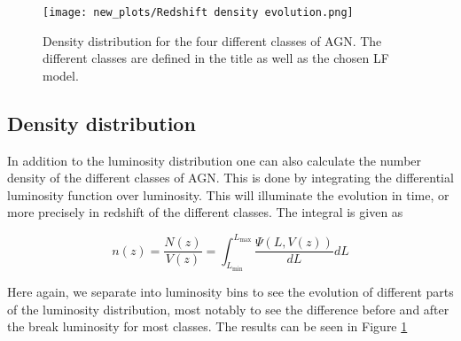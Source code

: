 \begin{figure}[H]
    \centering
    \texttt{[image: new\_plots/Redshift density evolution.png]}
    \caption{Density distribution for the four different classes of AGN. The different classes are defined in the title as well as the chosen LF model.}
    \label{fig:DD}
\end{figure}



\subsection{Density distribution}

In addition to the luminosity distribution one can also calculate the number density of the different classes of AGN. This is done by integrating the
differential luminosity function over luminosity. This will illuminate the evolution in time, or more precisely in redshift of the different classes. The integral is given as

\begin{equation}
    n(z) =\frac{N(z)}{V(z)} =  \int_{L_{\text{min}}}^{L_{\text{max}}} \frac{\Psi(L, V(z))}{dL} dL
\end{equation}

Here again, we separate into luminosity bins to see the evolution of different parts of the luminosity distribution, most notably to see the difference before and after the break luminosity for most classes. 
The results can be seen in Figure \ref*{fig:DD}








